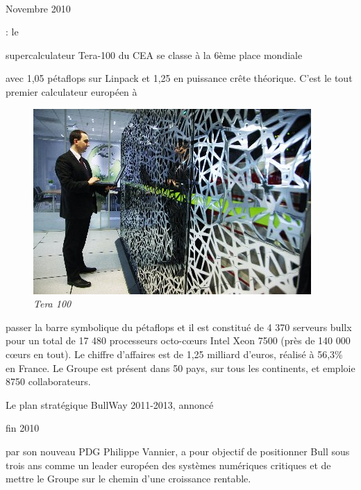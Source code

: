 \documentclass[11pt]{article}
\begin{document}
		\paragraph{}
		\begin{bf}Novembre 2010\end{bf} : le \begin{bf}supercalculateur Tera-100 du CEA se classe à la 6ème place mondiale\end{bf} 
		avec 1,05 pétaflops sur Linpack et 1,25 en puissance crête théorique. C'est le tout premier calculateur européen à 
		\begin{figure}
		\includegraphics{tera_100.jpg}
		\caption{\small{\it{Tera 100}}}
		\end{figure}
		passer la barre symbolique du pétaflops et il est constitué de 4 370 serveurs bullx pour un total de 17 480 processeurs 
		octo-cœurs Intel Xeon 7500 (près de 140 000 cœurs en tout). Le chiffre d’affaires est de 1,25 milliard d’euros, 
		réalisé à 56,3\% en France. Le Groupe est présent dans 50 pays, sur tous les continents, et emploie 8750 collaborateurs.

		Le plan stratégique BullWay 2011-2013, annoncé \begin{bf}fin 2010\end{bf} par son nouveau PDG Philippe Vannier, a 
		pour objectif de positionner Bull sous trois ans comme un leader européen des systèmes numériques critiques et de 
		mettre le Groupe sur le chemin d’une croissance rentable.
		\newpage
\end{document}
